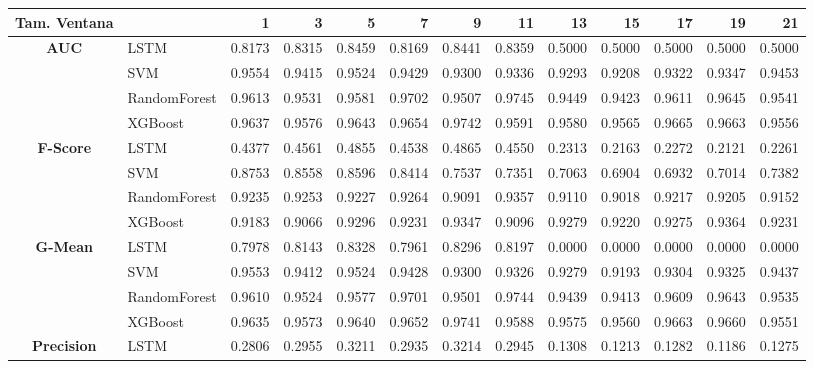 \begin{table}[h]
	\centering
	\begin{adjustbox}{max width=15cm}
		\begin{tabular}{|c|l|r|r|r|r|r|r|r|r|r|r|r|}
			\hline
			\textbf{Tam. Ventana}&         &      1  &      3  &      5  &      7  &      9  &      11 &      13 &      15 &      17 &      19 &      21 \\
			\hline
			\textbf{AUC} & LSTM &  0.8173 &  0.8315 &  0.8459 &  0.8169 &  0.8441 &  0.8359 &  0.5000 &  0.5000 &  0.5000 &  0.5000 &  0.5000 \\
			& SVM &  0.9554 &  0.9415 &  0.9524 &  0.9429 &  0.9300 &  0.9336 &  0.9293 &  0.9208 &  0.9322 &  0.9347 &  0.9453 \\
			& RandomForest &  0.9613 &  0.9531 &  0.9581 &  0.9702 &  0.9507 &  0.9745 &  0.9449 &  0.9423 &  0.9611 &  0.9645 &  0.9541 \\
			& XGBoost &  0.9637 &  0.9576 &  0.9643 &  0.9654 &  0.9742 &  0.9591 &  0.9580 &  0.9565 &  0.9665 &  0.9663 &  0.9556 \\
			\hline
			\textbf{F-Score} & LSTM &  0.4377 &  0.4561 &  0.4855 &  0.4538 &  0.4865 &  0.4550 &  0.2313 &  0.2163 &  0.2272 &  0.2121 &  0.2261 \\
			& SVM &  0.8753 &  0.8558 &  0.8596 &  0.8414 &  0.7537 &  0.7351 &  0.7063 &  0.6904 &  0.6932 &  0.7014 &  0.7382 \\
			& RandomForest &  0.9235 &  0.9253 &  0.9227 &  0.9264 &  0.9091 &  0.9357 &  0.9110 &  0.9018 &  0.9217 &  0.9205 &  0.9152 \\
			& XGBoost &  0.9183 &  0.9066 &  0.9296 &  0.9231 &  0.9347 &  0.9096 &  0.9279 &  0.9220 &  0.9275 &  0.9364 &  0.9231 \\
			\hline
			\textbf{G-Mean} & LSTM &  0.7978 &  0.8143 &  0.8328 &  0.7961 &  0.8296 &  0.8197 &  0.0000 &  0.0000 &  0.0000 &  0.0000 &  0.0000 \\
			& SVM &  0.9553 &  0.9412 &  0.9524 &  0.9428 &  0.9300 &  0.9326 &  0.9279 &  0.9193 &  0.9304 &  0.9325 &  0.9437 \\
			& RandomForest &  0.9610 &  0.9524 &  0.9577 &  0.9701 &  0.9501 &  0.9744 &  0.9439 &  0.9413 &  0.9609 &  0.9643 &  0.9535 \\
			& XGBoost &  0.9635 &  0.9573 &  0.9640 &  0.9652 &  0.9741 &  0.9588 &  0.9575 &  0.9560 &  0.9663 &  0.9660 &  0.9551 \\
			\hline
			\textbf{Precision} & LSTM &  0.2806 &  0.2955 &  0.3211 &  0.2935 &  0.3214 &  0.2945 &  0.1308 &  0.1213 &  0.1282 &  0.1186 &  0.1275 \\

\end{tabular}
\end{adjustbox}
\end{table}
